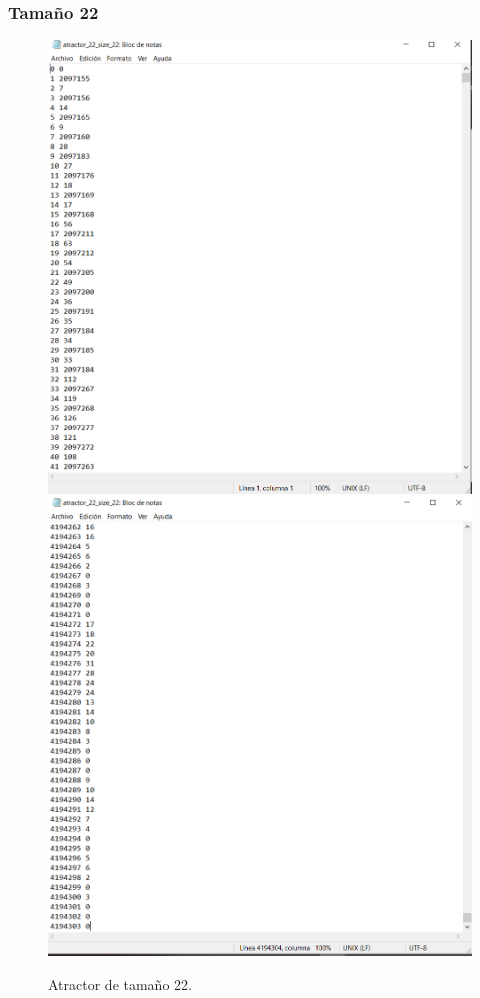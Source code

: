 \documentclass[11pt]{article}
\begin{document}
			\subsubsection{Tamaño 22}
			\begin{figure}[H]
			\centering
			\includegraphics[scale=0.3]{resources/Atractores22/atractor_22_size_22.png}
			\includegraphics[scale=0.3]{resources/Atractores22/atractor_22_size_221.png}
			\caption{Atractor de tamaño 22.}\label{fig:picture}
			\end{figure}
\end{document}
